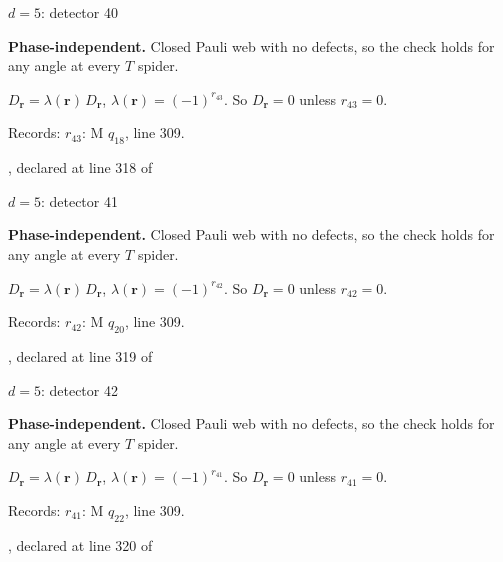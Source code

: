 \label{d5_det040}
{\Large $d=5$: detector 40}\par
\textbf{Phase-independent.} Closed Pauli web with no defects, so the check holds for any angle at every $T$ spider.
\begin{center}
\end{center}
\vspace{-1mm}
$D_{\boldsymbol r}=\lambda(\boldsymbol r)\,D_{\boldsymbol r}$, \quad $\lambda(\boldsymbol r)=(-1)^{r_{43}}$. \qquad So $D_{\boldsymbol r}=0$ unless $r_{43}=0$.
\par\smallskip\begin{minipage}{.98\linewidth}\small Records: $r_{43}$: M $q_{18}$, line 309.\end{minipage}
\vfill
{\footnotesize\texttt{}, declared at line 318 of \texttt{}}
\newpage

\label{d5_det041}
{\Large $d=5$: detector 41}\par
\textbf{Phase-independent.} Closed Pauli web with no defects, so the check holds for any angle at every $T$ spider.
\begin{center}
\end{center}
\vspace{-1mm}
$D_{\boldsymbol r}=\lambda(\boldsymbol r)\,D_{\boldsymbol r}$, \quad $\lambda(\boldsymbol r)=(-1)^{r_{42}}$. \qquad So $D_{\boldsymbol r}=0$ unless $r_{42}=0$.
\par\smallskip\begin{minipage}{.98\linewidth}\small Records: $r_{42}$: M $q_{20}$, line 309.\end{minipage}
\vfill
{\footnotesize\texttt{}, declared at line 319 of \texttt{}}
\newpage

\label{d5_det042}
{\Large $d=5$: detector 42}\par
\textbf{Phase-independent.} Closed Pauli web with no defects, so the check holds for any angle at every $T$ spider.
\begin{center}
\end{center}
\vspace{-1mm}
$D_{\boldsymbol r}=\lambda(\boldsymbol r)\,D_{\boldsymbol r}$, \quad $\lambda(\boldsymbol r)=(-1)^{r_{41}}$. \qquad So $D_{\boldsymbol r}=0$ unless $r_{41}=0$.
\par\smallskip\begin{minipage}{.98\linewidth}\small Records: $r_{41}$: M $q_{22}$, line 309.\end{minipage}
\vfill
{\footnotesize\texttt{}, declared at line 320 of \texttt{}}
\newpage


